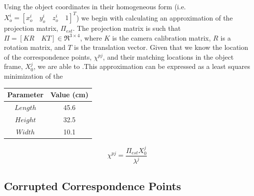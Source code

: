 \documentclass[12pt]{article}
\begin{document}
Using the object coordinates in their homogeneous form (i.e.\ $X_o^i = [x_o^i \quad y_o^i \quad z_o^i \quad 1]^T$) we begin with calculating an approximation of the projection matrix, $\Pi_{est}$. The projection matrix is such that $\Pi = [KR \quad KT] \in \Re^{3\times4}$, where $K$ is the camera calibration matrix, $R$ is a rotation matrix, and $T$ is the translation vector. Given that we know the location of the correspondence points, $\chi^{pj}$, and their matching locations in the object frame, $X_0^j$, we are able to .This approximation can be expressed as a least squares minimization of the 

\begin{center}
	\begin{tabular}[5pt]{| c| c|}
	\hline
    Parameter	& Value (cm) \\[0.5ex] 
	\hline 	
	$Length$& 45.6  \\ \hline 
	$Height$& 32.5  \\ \hline 
	$Width$& 10.1  \\ \hline 
\end{tabular}
\label{boxdim}
\end{center}






\begin{equation}\label{xp}
	\chi^{pj} = \dfrac{\Pi_{est} X_0^j}{\lambda^j}
\end{equation}



\subsection{Corrupted Correspondence Points}
\end{document}
